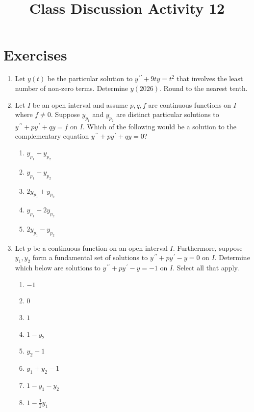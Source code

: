 \documentclass{ximera}
\begin{document}
\begin{abstract}
 \end{abstract}

    \title{Class Discussion Activity 12}
    
    \maketitle

\section*{Exercises}


\begin{enumerate}[label=(\arabic*)]

\item Let $y(t)$ be the particular solution to $y^{\,\prime\prime}+9ty=t^2$ that involves the least number of non-zero terms.   Determine $y(2026)$.  Round to the nearest tenth. 


\item Let $I$ be an open interval and assume $p,q,f$ are continuous functions on $I$ where $f\neq 0$.  Suppose $y_{p_1}$ and $y_{p_2}$ are distinct particular solutions to $y^{\,\prime\prime}+py^{\,\prime}+qy=f$ on $I$.  Which of the following would be a solution to the complementary equation $y^{\,\prime\prime}+py^{\,\prime}+qy=0$? 

\begin{enumerate}[label=(\alph*)]
\item $y_{p_1}+y_{p_2}$  
\item $y_{p_1}-y_{p_2}$ %
\item $2y_{p_1}+y_{p_2}$
\item $y_{p_1}-2y_{p_2}$
\item $2y_{p_1}-y_{p_2}$ 
\end{enumerate}





\item Let $p$ be a continuous function on an open interval $I$.  Furthermore, suppose $y_1,y_2$ form a fundamental set of solutions to $y^{\,\prime\prime}+py^{\,\prime}-y=0$ on $I$.  Determine which below are solutions to $y^{\,\prime\prime}+py^{\,\prime}-y=-1$  on $I$.  Select all that apply.


\begin{enumerate}[label=(\alph*)]
\item $-1$  
\item $0$
\item $1$  %
\item $1-y_2$ %
\item $y_2-1$ 
\item $y_1+y_2-1$  
\item $1-y_1-y_2$ %
\item $1-\displaystyle \frac{1}{2}y_1$ %
\end{enumerate}


\end{enumerate}
\end{document}
